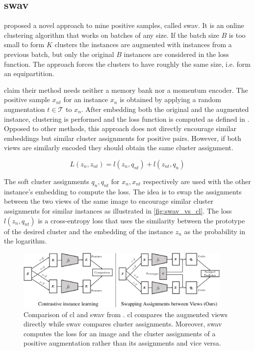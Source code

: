 \subsection{\acl{swav}}\label{subsec:SwAV}

\citet{swav_2020} proposed a novel approach to mine positive samples, called \ac{swav}.
It is an online clustering algorithm that works on batches of any size.
If the batch size $B$ is too small to form $K$ clusters the instances are augmented 
with instances from a previous batch, 
but only the original $B$ instances are considered in the loss function.
The approach forces the clusters to have roughly the same size, i.e. form an equipartition.

\citeauthor{swav_2020} claim their method needs neither a memory bank nor a momentum encoder.
The positive sample $x_{nt}$ for an instance $x_n$ is obtained by applying a 
random augmentation $t \in \mathcal{T}$ to $x_n$.
After embedding both the original and the augmented instance, clustering is performed and 
the loss function is computed as defined in .
Opposed to other methods, this approach does not directly encourage similar embeddings but similar 
cluster assignments for positive pairs.
However, if both views are similarly encoded they should obtain the same cluster assignment.

\begin{equation}
    L(z_n, z_{nt}) = l(z_n, q_{nt}) + l(z_{nt}, q_n)
    \label{eq:swav_loss}
\end{equation}

The soft cluster assignments $q_n, q_{nt}$ for $x_n, x_{nt}$ respectively 
are used with the other instance's embedding to compute the loss.
The idea is to swap the assignments between the two views of the same image to encourage 
similar cluster assignments for similar instances as illustrated in \autoref{fig:swav_vs_cl}.
The loss $l(z_n, q_{nt})$ is a cross-entropy loss that uses the similarity between the prototype 
of the desired cluster and the embedding of the instance $z_n$ as the probability in the logarithm.

\begin{figure}[!htb] %
    \centering
    \includegraphics[width=300pt]{images/SwAV_vs_CL.png}
    \caption{Comparison of \ac{cl} and \ac{swav} from \citet{swav_2020}.
    \ac{cl} compares the augmented views directly while 
    \ac{swav} compares cluster assignments.
    Moreover, \ac{swav} computes the loss for an image and the cluster assignments of a positive augmentation 
    rather than its assignments and vice versa.}
    \label{fig:swav_vs_cl}
\end{figure}

